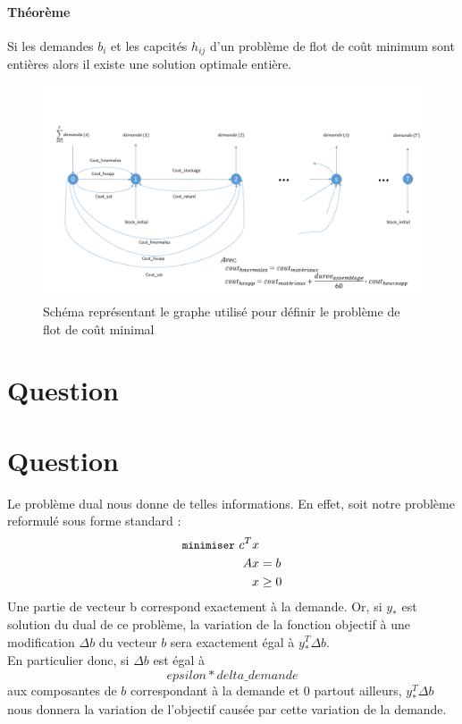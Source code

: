 \documentclass[12pt,oneside,a4paper]{article}
\newcommand{\question}
{
\addtocounter{section}{1}
\section*{Question \thesection}
}
\newcommand{\texttts}[1]{{\small\texttt{#1}}}
\begin{document}
\paragraph{Théorème}
Si les demandes $b_i$ et les capcités $h_{ij}$ d'un problème de flot de coût minimum sont entières alors il existe une solution optimale entière.
\begin{figure}[hp]
	\centering
		\includegraphics[scale = 0.5]{Schema_flot.png}
	\caption{Schéma représentant le graphe utilisé pour définir le problème de flot de coût minimal}
	\label{fig:schema_flot}
\end{figure}

\question %

\question %
Le problème dual nous donne de telles informations. En effet, soit notre problème reformulé sous forme standard : \\
\begin{align*} 
	\texttts{minimiser} \, \, c^Tx &\\
	Ax &= b  \\
	x &\geq 0 
\end{align*}
Une partie de vecteur b correspond exactement à la demande.
Or, si $y_{*}$ est solution du dual de ce problème, la variation de la fonction objectif à une modification $\Delta b$ du vecteur $b$ sera exactement égal à $y_{*}^{T}\Delta b$. \\
En particulier donc, si $\Delta b$ est égal à $$epsilon * delta\_demande$$ aux composantes de $b$ correspondant à la demande et 0 partout ailleurs, $y_{*}^{T}\Delta b$ nous donnera la variation de l'objectif causée par cette variation de la demande.
\end{document}
